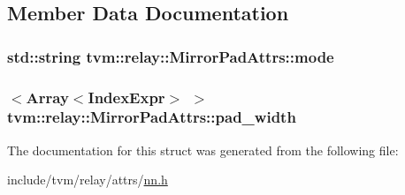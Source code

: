 \subsection{Member Data Documentation}
\subsubsection[{\texorpdfstring{mode}{mode}}]{\setlength{\rightskip}{0pt plus 5cm}std\+::string tvm\+::relay\+::\+Mirror\+Pad\+Attrs\+::mode}\hypertarget{structtvm_1_1relay_1_1MirrorPadAttrs_af5381d72f1d9c9abcb9d2e522966ad86}{}\label{structtvm_1_1relay_1_1MirrorPadAttrs_af5381d72f1d9c9abcb9d2e522966ad86}
\subsubsection[{\texorpdfstring{pad\+\_\+width}{pad_width}}]{$<${\bf Array}$<${\bf Index\+Expr}$>$ $>$ tvm\+::relay\+::\+Mirror\+Pad\+Attrs\+::pad\+\_\+width}\hypertarget{structtvm_1_1relay_1_1MirrorPadAttrs_aca1ad3c67652c162ea7008f1b9e1dad4}{}\label{structtvm_1_1relay_1_1MirrorPadAttrs_aca1ad3c67652c162ea7008f1b9e1dad4}


The documentation for this struct was generated from the following file\+:\begin{DoxyCompactItemize}
\item 
include/tvm/relay/attrs/\hyperlink{include_2tvm_2relay_2attrs_2nn_8h}{nn.\+h}\end{DoxyCompactItemize}
